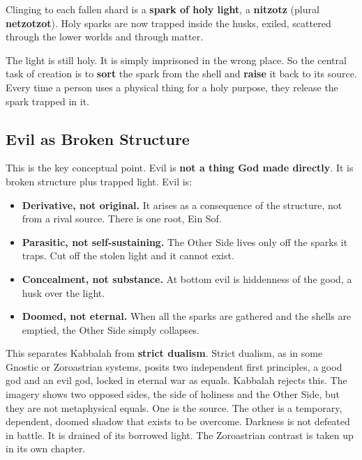 Clinging to each fallen shard is a \textbf{spark of holy light}, a \textbf{nitzotz} (plural
\textbf{netzotzot}). Holy sparks are now trapped inside the husks, exiled, scattered through the lower
worlds and through matter.

The light is still holy. It is simply imprisoned in the wrong place. So the central task of creation is
to \textbf{sort} the spark from the shell and \textbf{raise} it back to its source. Every time a person
uses a physical thing for a holy purpose, they release the spark trapped in it.

\subsection{Evil as Broken Structure}

This is the key conceptual point. Evil is \textbf{not a thing God made directly}. It is broken structure
plus trapped light. Evil is:

\begin{itemize}
 \item \textbf{Derivative, not original.} It arises as a consequence of the structure, not from a rival
 source. There is one root, Ein Sof.
 \item \textbf{Parasitic, not self-sustaining.} The Other Side lives only off the sparks it traps. Cut
 off the stolen light and it cannot exist.
 \item \textbf{Concealment, not substance.} At bottom evil is hiddenness of the good, a husk over the
 light.
 \item \textbf{Doomed, not eternal.} When all the sparks are gathered and the shells are emptied, the
 Other Side simply collapses.
\end{itemize}

This separates Kabbalah from \textbf{strict dualism}. Strict dualism, as in some Gnostic or
Zoroastrian systems, posits two independent first principles, a good god and an evil god, locked in
eternal war as equals. Kabbalah rejects this. The imagery shows two opposed sides, the side of holiness
and the Other Side, but they are not metaphysical equals. One is the source. The other is a temporary,
dependent, doomed shadow that exists to be overcome. Darkness is not defeated in battle. It is drained
of its borrowed light. The Zoroastrian contrast is taken up in its own chapter.
